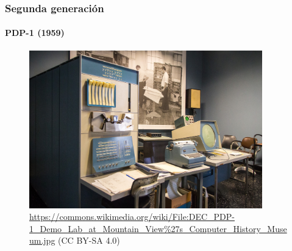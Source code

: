 \documentclass[11pt,a4paper,spanish]{beamer}
\begin{document}
\begin{frame}

\frametitle{Segunda generación}
\framesubtitle{PDP-1 (1959)}

\begin{figure}
    \includegraphics[width=0.9\textwidth]{img/pdp1.jpg}
    \captionsetup{textfont=tiny,labelformat=empty}
    \caption{\url{https://commons.wikimedia.org/wiki/File:DEC\_PDP-1\_Demo\_Lab\_at\_Mountain\_View\%27s\_Computer\_History\_Museum.jpg}
        (CC BY-SA 4.0)}
\end{figure}

\end{frame}
\end{document}
